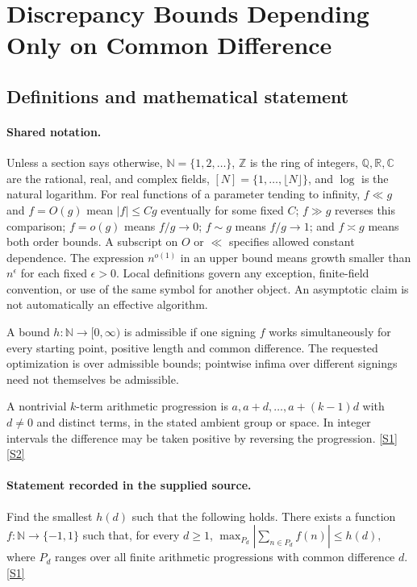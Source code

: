 \documentclass[11pt,a4paper]{article}
\newcommand{\N}{\mathbb{N}}
\newcommand{\Z}{\mathbb{Z}}
\newcommand{\Q}{\mathbb{Q}}
\newcommand{\R}{\mathbb{R}}
\newcommand{\C}{\mathbb{C}}
\newcommand{\sref}[2]{\hyperlink{source:#1:#2}{[S#2]}}
\begin{document}
\section{Discrepancy Bounds Depending Only on Common Difference}\label{statement}


\subsection{Definitions and mathematical statement}

\paragraph{Shared notation.}Unless a section says otherwise, $\N=\{1,2,\ldots\}$,
$\Z$ is the ring of integers, $\Q,\R,\C$ are the rational, real, and complex
fields, $[N]=\{1,\ldots,\lfloor N\rfloor\}$, and $\log$ is the natural
logarithm. For real functions of a parameter tending to infinity,
$f\ll g$ and $f=O(g)$ mean $|f|\leq Cg$ eventually for some fixed $C$;
$f\gg g$ reverses this comparison; $f=o(g)$ means $f/g\to0$;
$f\sim g$ means $f/g\to1$; and $f\asymp g$ means both order bounds.
A subscript on $O$ or $\ll$ specifies allowed constant dependence.
The expression $n^{o(1)}$ in an upper bound means growth smaller than
$n^\epsilon$ for each fixed $\epsilon>0$. Local definitions govern any
exception, finite-field convention, or use of the same symbol for another
object. An asymptotic claim is not automatically an effective algorithm.



A bound $h:\N\to[0,\infty)$ is admissible if one signing $f$ works simultaneously for every starting point, positive length and common difference. The requested optimization is over admissible bounds; pointwise infima over different signings need not themselves be admissible.

A nontrivial $k$-term arithmetic progression is $a,a+d,\ldots,a+(k-1)d$ with $d\ne0$ and distinct terms, in the stated ambient group or space. In integer intervals the difference may be taken positive by reversing the progression. \sref{statement}{1} \sref{statement}{2}

\paragraph{Statement recorded in the supplied source.}
Find the smallest $h(d)$ such that the following holds. There exists a function $f:\mathbb{N}\to\{-1,1\}$ such that, for every $d\geq 1$, $ \max_{P_d}\left\lvert \sum_{n\in P_d}f(n)\right\rvert\leq h(d), $ where $P_d$ ranges over all finite arithmetic progressions with common difference $d$. \sref{statement}{1}
\end{document}
